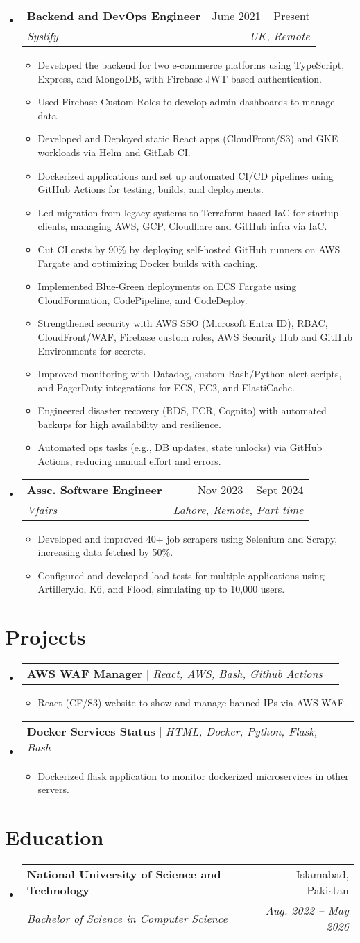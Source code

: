 \documentclass[letterpaper,11pt]{article}
\makeatletter
\newcommand{\resumeItem}[1]{
  \item\small{
    {#1 \vspace{-2pt}}
  }
}
\newcommand{\resumeSubheading}[4]{
  \vspace{-2pt}\item
    \begin{tabular*}{0.97\textwidth}[t]{l@{\extracolsep{\fill}}r}
      \textbf{#1} & #2 \\
      \textit{\small#3} & \textit{\small #4} \\
    \end{tabular*}\vspace{-7pt}
}
\newcommand{\resumeProjectHeading}[2]{
    \item
    \begin{tabular*}{0.97\textwidth}{l@{\extracolsep{\fill}}r}
      \small#1 & #2 \\
    \end{tabular*}\vspace{-7pt}
}
\newcommand{\resumeSubHeadingListStart}{\begin{itemize}[leftmargin=0.15in, label={}]}
\newcommand{\resumeSubHeadingListEnd}{\end{itemize}}
\newcommand{\resumeItemListStart}{\begin{itemize}}
\newcommand{\resumeItemListEnd}{\end{itemize}\vspace{-5pt}}
\makeatother
\begin{document}
  \resumeSubHeadingListStart

    \resumeSubheading
      {Backend and DevOps Engineer}{June 2021 -- Present}
      {Syslify}{UK, Remote}
      \resumeItemListStart
        \resumeItem{Developed the backend for two e-commerce platforms using TypeScript, Express, and MongoDB, with Firebase JWT-based authentication.}
        \resumeItem{Used Firebase Custom Roles to develop admin dashboards to manage data.}
        \resumeItem{Developed and Deployed static React apps (CloudFront/S3) and GKE workloads via Helm and GitLab CI.}
        \resumeItem{Dockerized applications and set up automated CI/CD pipelines using GitHub Actions for testing, builds, and deployments.}
        \resumeItem{Led migration from legacy systems to Terraform-based IaC for startup clients, managing AWS, GCP, Cloudflare and GitHub infra via IaC.}
        \resumeItem{Cut CI costs by 90\% by deploying self-hosted GitHub runners on AWS Fargate and optimizing Docker builds with caching.}
        \resumeItem{Implemented Blue-Green deployments on ECS Fargate using CloudFormation, CodePipeline, and CodeDeploy.}
        \resumeItem{Strengthened security with AWS SSO (Microsoft Entra ID), RBAC, CloudFront/WAF, Firebase custom roles, AWS Security Hub and GitHub Environments for secrets.}
        \resumeItem{Improved monitoring with Datadog, custom Bash/Python alert scripts, and PagerDuty integrations for ECS, EC2, and ElastiCache.}
        \resumeItem{Engineered disaster recovery (RDS, ECR, Cognito) with automated backups for high availability and resilience.}
        \resumeItem{Automated ops tasks (e.g., DB updates, state unlocks) via GitHub Actions, reducing manual effort and errors.}
      \resumeItemListEnd
  \resumeSubHeadingListEnd
  \resumeSubHeadingListStart

    \resumeSubheading
      {Assc. Software Engineer}{Nov 2023 -- Sept 2024}
      {Vfairs}{Lahore, Remote, Part time}
      \resumeItemListStart
        \resumeItem{Developed and improved 40+ job scrapers using Selenium and Scrapy, increasing data fetched by 50\%.}
                \resumeItem{Configured and developed load tests for multiple applications using Artillery.io, K6, and Flood, simulating up to 10,000 users.}
      \resumeItemListEnd
  \resumeSubHeadingListEnd

\section{Projects}
    \resumeSubHeadingListStart
      \resumeProjectHeading
        {\textbf{AWS WAF Manager} $|$ \emph{React, AWS, Bash, Github Actions}}{}
          \resumeItemListStart
            \resumeItem{React (CF/S3) website to show and manage banned IPs via AWS WAF.}
          \resumeItemListEnd
      \resumeProjectHeading
        {\textbf{Docker Services Status} $|$ \emph{HTML, Docker, Python, Flask, Bash}}{}
          \resumeItemListStart
            \resumeItem{Dockerized flask application to monitor dockerized microservices in other servers.}
          \resumeItemListEnd
    \resumeSubHeadingListEnd

\section{Education}
  \resumeSubHeadingListStart
    \resumeSubheading
      {National University of Science and Technology}{Islamabad, Pakistan}
      {Bachelor of Science in Computer Science}{Aug. 2022 -- May 2026}
  \resumeSubHeadingListEnd
\end{document}
